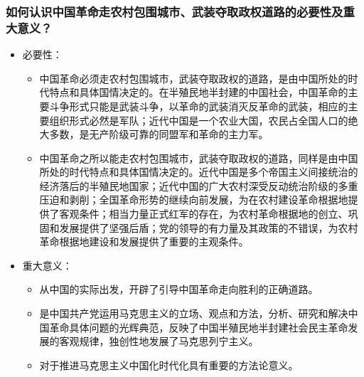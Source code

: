 \documentclass{article}
\begin{document}
\subsubsection{如何认识中国革命走农村包围城市、武装夺取政权道路的必要性及重大意义？}
\begin{itemize}
    \item 必要性：
    \begin{itemize}
        \item 中国革命必须走农村包围城市，武装夺取政权的道路，是由中国所处的时代特点和具体国情决定的。在半殖民地半封建的中国社会，中国革命的主要斗争形式只能是武装斗争，以革命的武装消灭反革命的武装，相应的主要组织形式必然是军队；近代中国是一个农业大国，农民占全国人口的绝大多数，是无产阶级可靠的同盟军和革命的主力军。
        \item 中国革命之所以能走农村包围城市，武装夺取政权的道路，同样是由中国所处的时代特点和具体国情决定的。近代中国是多个帝国主义间接统治的经济落后的半殖民地国家；近代中国的广大农村深受反动统治阶级的多重压迫和剥削；全国革命形势的继续向前发展，为在农村建设革命根据地提供了客观条件；相当力量正式红军的存在，为农村革命根据地的创立、巩固和发展提供了坚强后盾；党的领导的有力量及其政策的不错误，为农村革命根据地建设和发展提供了重要的主观条件。
    \end{itemize}
    \item 重大意义：
    \begin{itemize}
        \item 从中国的实际出发，开辟了引导中国革命走向胜利的正确道路。
        \item 是中国共产党运用马克思主义的立场、观点和方法，分析、研究和解决中国革命具体问题的光辉典范，反映了中国半殖民地半封建社会民主革命发展的客观规律，独创性地发展了马克思列宁主义。
        \item 对于推进马克思主义中国化时代化具有重要的方法论意义。
    \end{itemize}
\end{itemize}
\end{document}
